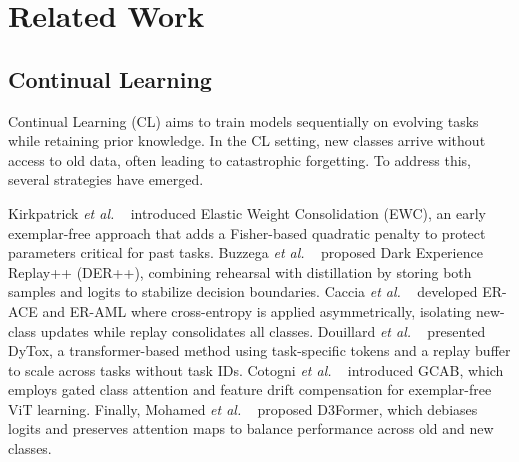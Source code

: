 \section{Related Work}
\label{2}
\subsection{Continual Learning}
\label{2.1}
Continual Learning (CL) aims to train models sequentially on evolving tasks while retaining prior knowledge. In the CL setting, new classes arrive without access to old data, often leading to catastrophic forgetting. To address this, several strategies have emerged.  

Kirkpatrick \textit{et al.} ~\cite{kirkpatrick2017overcoming} introduced Elastic Weight Consolidation (EWC), an early exemplar-free approach that adds a Fisher-based quadratic penalty to protect parameters critical for past tasks. Buzzega \textit{et al.} ~\cite{buzzega2020dark} proposed Dark Experience Replay++ (DER++), combining rehearsal with distillation by storing both samples and logits to stabilize decision boundaries. Caccia \textit{et al.} ~\cite{caccia2021new} developed ER-ACE and ER-AML where cross-entropy is applied asymmetrically, isolating new-class updates while replay consolidates all classes. Douillard \textit{et al.} ~\cite{douillard2022dytox} presented DyTox, a transformer-based method using task-specific tokens and a replay buffer to scale across tasks without task IDs. Cotogni \textit{ et al.} ~\cite{cotogni2025exemplar} introduced GCAB, which employs gated class attention and feature drift compensation for exemplar-free ViT learning. Finally, Mohamed \textit{et al.} ~\cite{mohamed2023d3former} proposed D3Former, which debiases logits and preserves attention maps to balance performance across old and new classes.
  
 
